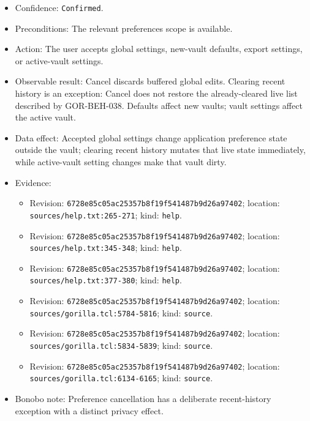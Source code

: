 \documentclass[
  letterpaper,
]{article}
\newcommand{\passthrough}[1]{#1}
\providecommand{\tightlist}{%
  \setlength{\itemsep}{0pt}\setlength{\parskip}{0pt}}
\begin{document}
\begin{itemize}
\tightlist
\item
  Confidence: \passthrough{\lstinline!Confirmed!}.
\item
  Preconditions: The relevant preferences scope is available.
\item
  Action: The user accepts global settings, new-vault defaults, export settings, or active-vault settings.
\item
  Observable result: Cancel discards buffered global edits. Clearing recent history is an exception: Cancel does not
  restore the already-cleared live list described by GOR-BEH-038. Defaults affect new vaults; vault settings affect the
  active vault.
\item
  Data effect: Accepted global settings change application preference state outside the vault; clearing recent history
  mutates that live state immediately, while active-vault setting changes make that vault dirty.
\item
  Evidence:

  \begin{itemize}
  \tightlist
  \item
    Revision: \nolinkurl{6728e85c05ac25357b8f19f541487b9d26a97402}; location: \nolinkurl{sources/help.txt:265-271};
    kind: \passthrough{\lstinline!help!}.
  \item
    Revision: \nolinkurl{6728e85c05ac25357b8f19f541487b9d26a97402}; location: \nolinkurl{sources/help.txt:345-348};
    kind: \passthrough{\lstinline!help!}.
  \item
    Revision: \nolinkurl{6728e85c05ac25357b8f19f541487b9d26a97402}; location: \nolinkurl{sources/help.txt:377-380};
    kind: \passthrough{\lstinline!help!}.
  \item
    Revision: \nolinkurl{6728e85c05ac25357b8f19f541487b9d26a97402}; location: \nolinkurl{sources/gorilla.tcl:5784-5816};
    kind: \passthrough{\lstinline!source!}.
  \item
    Revision: \nolinkurl{6728e85c05ac25357b8f19f541487b9d26a97402}; location: \nolinkurl{sources/gorilla.tcl:5834-5839};
    kind: \passthrough{\lstinline!source!}.
  \item
    Revision: \nolinkurl{6728e85c05ac25357b8f19f541487b9d26a97402}; location: \nolinkurl{sources/gorilla.tcl:6134-6165};
    kind: \passthrough{\lstinline!source!}.
  \end{itemize}
\item
  Bonobo note: Preference cancellation has a deliberate recent-history exception with a distinct privacy effect.
\end{itemize}
\end{document}
